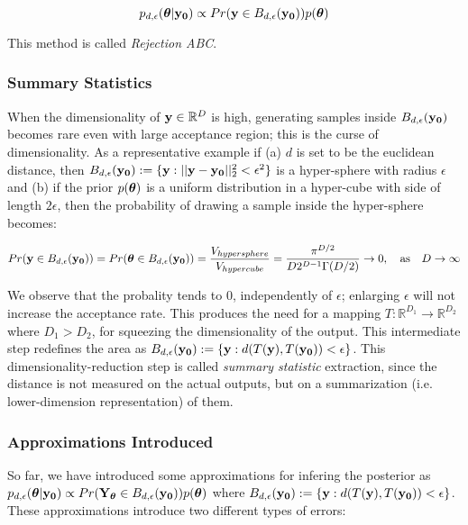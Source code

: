 \begin{equation} \label{eq:approx_posterior}
  p_{d,\epsilon}(\boldsymbol{\theta}|\mathbf{y_0}) \propto Pr(\mathbf{y} \in
  B_{d,\epsilon}(\mathbf{y_0})) p(\boldsymbol{\theta})
\end{equation}

\noindent
This method is called \textit{Rejection ABC}.

\subsubsection{Summary Statistics}

When the dimensionality of $\mathbf{y} \in \mathbb{R}^D$ is high, generating
samples inside $B_{d,\epsilon} (\mathbf{y_0})$ becomes rare even with large
acceptance region; this is the curse of dimensionality. As a
representative example if (a) $d$ is set to be the euclidean distance,
then $B_{d,\epsilon}(\mathbf{y_0}) := \{ \mathbf{y}: ||\mathbf{y} - \mathbf{y_0}||_2^2 < \epsilon^2 \}$
is a hyper-sphere with radius $\epsilon$ and (b) if the prior
$p(\boldsymbol{\theta})$ is a uniform distribution in a hyper-cube with side of
length $2\epsilon$, then the probability of drawing a sample inside
the hyper-sphere becomes:

\begin{equation}
  Pr(\mathbf{y} \in B_{d,\epsilon} (\mathbf{y_0})) = Pr(\boldsymbol{\theta} \in B_{d,\epsilon} (\mathbf{y_0})) = \frac{V_{hypersphere}}{V_{hypercube}} = \frac{\pi^{D/2}}{D2^{D-1}\Gamma(D/2)} \rightarrow 0, \quad \text{as} \quad D \rightarrow \infty
\end{equation}

\noindent 
We observe that the probality tends to $0$, independently of
$\epsilon$; enlarging $\epsilon$ will not increase the acceptance
rate. This produces the need for a mapping
$T: \mathbb{R}^{D_1} \rightarrow \mathbb{R}^{D_2}$ where $D_1 > D_2$,
for squeezing the dimensionality of the output. This intermediate step
redefines the area as
$B_{d,\epsilon}(\mathbf{y_0}) := \{\mathbf{y}: d(T(\mathbf{y}), T(\mathbf{y_0})) < \epsilon \}$. This
dimensionality-reduction step is called \textit{summary statistic}
extraction, since the distance is not measured on the actual outputs,
but on a summarization (i.e. lower-dimension representation) of them.

\subsubsection{Approximations Introduced}

So far, we have introduced some approximations for infering the
posterior as
$p_{d,\epsilon}(\boldsymbol{\theta}|\mathbf{y_0}) \propto Pr(\mathbf{Y}_{\boldsymbol{\theta}} \in
B_{d,\epsilon}(\mathbf{y_0}))p(\boldsymbol{\theta})$ where
$B_{d,\epsilon}(\mathbf{y_0}) := \{\mathbf{y}: d(T(\mathbf{y}), T(\mathbf{y_0})) < \epsilon \}$. These
approximations introduce two different types of errors:


